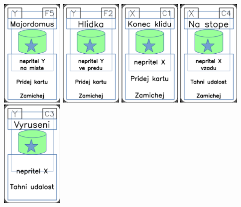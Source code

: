 \documentclass[a4paper]{article}
\begin{document}
	\includegraphics[width=3.0cm]{img-5_29}
	\includegraphics[width=3.0cm]{img-5_26}
	\includegraphics[width=3.0cm]{img-5_10}
	\includegraphics[width=3.0cm]{img-5_13}
	\includegraphics[width=3.0cm]{img-5_42}
\end{document}
